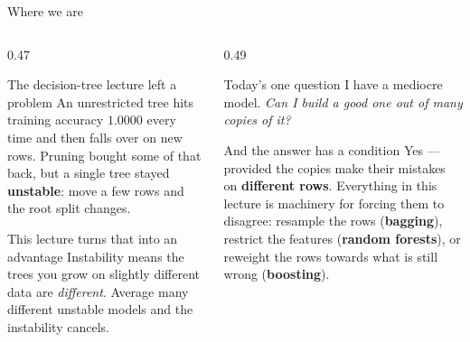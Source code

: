 \documentclass[aspectratio=169]{beamer}
\begin{document}
\begin{frame}[shrink=5]{Where we are}
  \begin{columns}[T]
    \begin{column}{0.47\textwidth}
      \begin{block}{The decision-tree lecture left a problem}
        An unrestricted tree hits training accuracy $1.0000$ every time and
        then falls over on new rows. Pruning bought some of that back, but a
        single tree stayed \textbf{unstable}: move a few rows and the root
        split changes.
      \end{block}
      \begin{block}{This lecture turns that into an advantage}
        Instability means the trees you grow on slightly different data are
        \emph{different}. Average many different unstable models and the
        instability cancels.
      \end{block}
    \end{column}
    \begin{column}{0.49\textwidth}
      \begin{exampleblock}{Today's one question}
        I have a mediocre model. \emph{Can I build a good one out of many
        copies of it?}
      \end{exampleblock}
      \begin{alertblock}{And the answer has a condition}
        Yes --- provided the copies make their mistakes on
        \textbf{different rows}. Everything in this lecture is machinery for
        forcing them to disagree: resample the rows (\textbf{bagging}),
        restrict the features (\textbf{random forests}), or reweight the rows
        towards what is still wrong (\textbf{boosting}).
      \end{alertblock}
    \end{column}
  \end{columns}
\end{frame}
\end{document}
